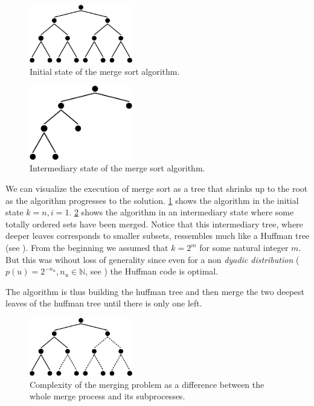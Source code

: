 \begin{figure}
	\centering
	\includegraphics[width=0.4\textwidth]{fig/merging/huffman-1-trim}
	\caption{\label{tree:merging:fig/huffman-1} Initial state of the merge sort algorithm.}
\end{figure}

\begin{figure}
	\centering
	\includegraphics[width=0.4\textwidth]{fig/merging/huffman-3-trim}
	\caption{\label{tree:merging:fig/huffman-3} Intermediary state of the merge sort algorithm.}
\end{figure}

We can visualize the execution of merge sort as a tree that shrinks up to the root as the algorithm progresses to the solution. \ref{tree:merging:fig/huffman-1} shows the algorithm in the initial state $k = n, i = 1$. \ref{tree:merging:fig/huffman-3} shows the algorithm in an intermediary state where some totally ordered sets have been merged. Notice that this intermediary tree, where deeper leaves corresponds to smaller subsets, ressembles much like a Huffman tree (see \cite{huffman1952method}). From the beginning we assumed that $k = 2^m$ for some natural integer $m$. But this was wihout loss of generality since even for a non \emph{dyadic distribution} ($p(u) = 2^{-n_u}, n_u \in \mathbb{N}$, see \cite{cover2012elements}) the Huffman code is optimal.

The algorithm is thus building the huffman tree and then merge the two deepest leaves of the huffman tree until there is only one left.

\begin{figure}
	\centering
	\includegraphics[width=0.4\textwidth]{fig/merging/huffman-2-trim}
	\caption{\label{tree:merging:fig/huffman-2} Complexity of the merging problem as a difference between the whole merge process and its subprocesses.}
\end{figure}


